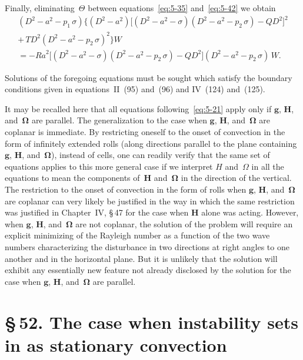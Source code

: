 Finally, eliminating~$\Theta$ between equations~\eqref{eq:5-35}
and~\eqref{eq:5-42} we obtain
\begin{multline}
  (D^{2}\!-\!a^{2}\!-\!p_1\,\sigma)
  \bigl\{(D^{2}\!-\!a^{2})
    \bigl[(D^{2}\!-\!a^{2}\!-\!\sigma)(D^{2}\!-\!a^{2}\!-\!p_2\,\sigma)
      -QD^{2}\bigr]^{2} \\
  +\,T D^{2}(D^{2}\!-\!a^{2}\!-\!p_2\,\sigma)^{2}\bigr\}W \\
  = -\mathit{Ra}^{2}
    \bigl[(D^{2}\!-\!a^{2}\!-\!\sigma)(D^{2}\!-\!a^{2}\!-\!p_2\,\sigma)
    -QD^{2}\bigr]
    (D^{2}\!-\!a^{2}\!-\!p_2\,\sigma)\,W.
  \label{eq:5-43}
\end{multline}

Solutions of the foregoing equations must be sought which satisfy the
boundary conditions given in equations~II~(95) and~(96) and IV~(124)
and~(125).

It may be recalled here that all equations following~\eqref{eq:5-21} apply only if
$\mathbf{g}$, $\mathbf{H}$, and~$\boldsymbol{\Omega}$ are parallel.  The
generalization to the case when $\mathbf{g}$, $\mathbf{H}$,
and~$\boldsymbol{\Omega}$ are coplanar is immediate.  By restricting oneself
to the onset of convection in the form of infinitely extended rolls (along
directions parallel to the plane containing $\mathbf{g}$, $\mathbf{H}$,
and~$\boldsymbol{\Omega}$), instead of cells, one can readily verify that the
same set of equations applies to this more general case if we interpret $H$
and~$\Omega$ in all the equations to mean the components of~$\mathbf{H}$
and~$\boldsymbol{\Omega}$ in the direction of the vertical.  The restriction
to the onset of convection in the form of rolls when $\mathbf{g}$,
$\mathbf{H}$, and~$\boldsymbol{\Omega}$ are coplanar can very likely be
justified in the way in which the same restriction was justified in
Chapter~IV, \S\,47 for the case when $\mathbf{H}$ alone was acting.
However, when $\mathbf{g}$, $\mathbf{H}$, and~$\boldsymbol{\Omega}$ are not
coplanar, the solution of the problem will require an explicit minimizing of
the Rayleigh number as a function of the two wave numbers characterizing the
disturbance in two directions at right angles to one another and in the
horizontal plane.  But it is unlikely that the solution will exhibit any
essentially new feature not already disclosed by the solution for the case
when $\mathbf{g}$, $\mathbf{H}$, and~$\boldsymbol{\Omega}$ are parallel.

\section*{\S\,52. The case when instability sets in as stationary convection}

